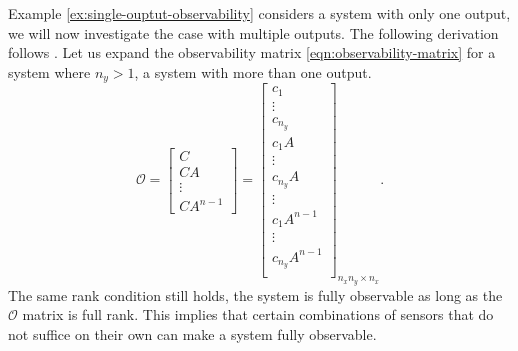 Example \ref{ex:single-ouptut-observability} considers a system with only one output, we will now investigate the case with multiple outputs. The following derivation follows \cite[Section 3.4 D 2]{Antsaklis2006LinearProcessing}. Let us expand the observability matrix \eqref{eqn:observability-matrix} for a system where $n_y>1$, a system with more than one output.
\begin{equation*}
\mathcal{O}=
\begin{bmatrix}
    C \\
    CA \\
    \vdots \\
    CA^{n-1}
\end{bmatrix}    
=
\begin{bmatrix}
    c_1 \\
    \vdots \\
    c_{n_y} \\
    c_1A \\
    \vdots \\
    c_{n_y}A \\
    \vdots \\
    c_1A^{n-1}\\
    \vdots \\
    c_{n_y}A^{n-1} \\
\end{bmatrix}_{n_xn_y \times n_x}.
\end{equation*}
The same rank condition still holds, the system is fully observable as long as the $\mathcal{O}$ matrix is full rank. This implies that certain combinations of sensors that do not suffice on their own can make a system fully observable.

